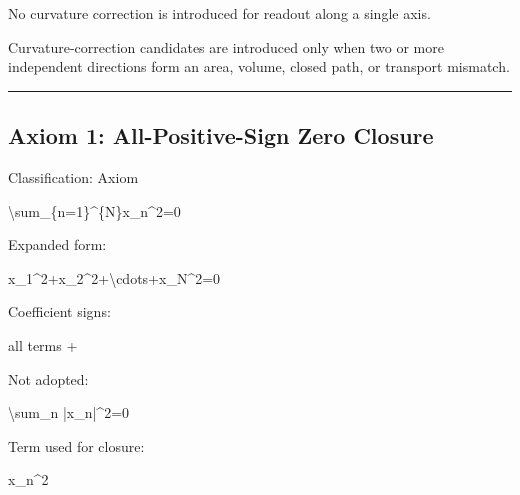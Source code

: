 \documentclass[
  a4paper]{article}
\newenvironment{Shaded}{}{}
\newcommand{\NormalTok}[1]{#1}
\begin{document}
No curvature correction is introduced for readout along a single axis.

Curvature-correction candidates are introduced only when two or more
independent directions form an area, volume, closed path, or transport
mismatch.

\begin{center}\rule{0.5\linewidth}{0.5pt}\end{center}

\subsection{Axiom 1: All-Positive-Sign Zero
Closure}\label{axiom-1-all-positive-sign-zero-closure}

Classification: Axiom

\begin{Shaded}
\begin{Highlighting}[]
\NormalTok{\textbackslash{}sum\_\{n=1\}\^{}\{N\}x\_n\^{}2=0}
\end{Highlighting}
\end{Shaded}

Expanded form:

\begin{Shaded}
\begin{Highlighting}[]
\NormalTok{x\_1\^{}2+x\_2\^{}2+\textbackslash{}cdots+x\_N\^{}2=0}
\end{Highlighting}
\end{Shaded}

Coefficient signs:

\begin{Shaded}
\begin{Highlighting}[]
\NormalTok{all terms +}
\end{Highlighting}
\end{Shaded}

Not adopted:

\begin{Shaded}
\begin{Highlighting}[]
\NormalTok{\textbackslash{}sum\_n |x\_n|\^{}2=0}
\end{Highlighting}
\end{Shaded}

Term used for closure:

\begin{Shaded}
\begin{Highlighting}[]
\NormalTok{x\_n\^{}2}
\end{Highlighting}
\end{Shaded}
\end{document}
